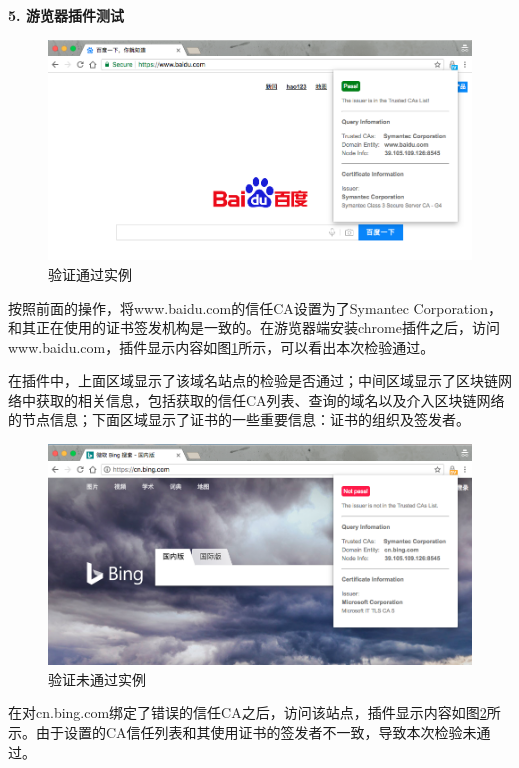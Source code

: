 \noindent\textbf{5. 游览器插件测试}

\begin{figure}[!htbp]
 	\centering
 	\includegraphics[scale=0.45]{img/pass}
 	\caption{验证通过实例}\label{fig:pass}
\end{figure}

按照前面的操作，将www.baidu.com的信任CA设置为了Symantec Corporation，和其正在使用的证书签发机构是一致的。在游览器端安装chrome插件之后，访问www.baidu.com，插件显示内容如图\ref{fig:pass}所示，可以看出本次检验通过。



在插件中，上面区域显示了该域名站点的检验是否通过；中间区域显示了区块链网络中获取的相关信息，包括获取的信任CA列表、查询的域名以及介入区块链网络的节点信息；下面区域显示了证书的一些重要信息：证书的组织及签发者。


\begin{figure}[!htbp]
 	\centering
 	\includegraphics[scale=0.45]{img/notPass}
 	\caption{验证未通过实例}\label{fig:notPass}
\end{figure}

在对cn.bing.com绑定了错误的信任CA之后，访问该站点，插件显示内容如图\ref{fig:notPass}所示。由于设置的CA信任列表和其使用证书的签发者不一致，导致本次检验未通过。




